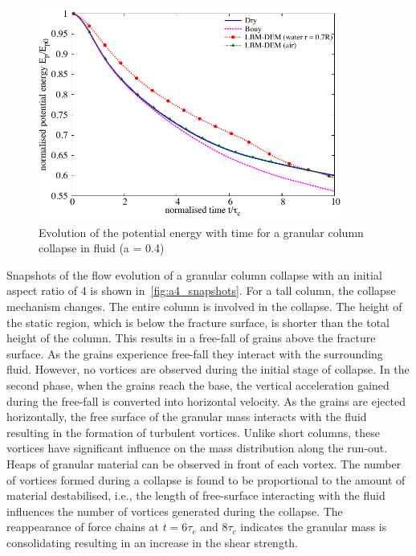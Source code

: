 \begin{figure}
	\centering
    \includegraphics[width=0.9\textwidth]{PE_a04f}
    \caption{Evolution of the potential energy with time for a granular column 
    collapse in fluid (a = 0.4)}
    \label{fig:PE_a04f}
\end{figure}


Snapshots of the flow evolution of a granular column collapse with an initial 
aspect ratio of 4 is shown in~\cref{fig:a4_snapshots}. For a tall column, the 
collapse mechanism changes. The entire column is involved in the collapse. The 
height of the static region, which is below the fracture surface, is shorter 
than the total height of the column. This results in a free-fall of grains 
above the fracture surface. As the grains experience free-fall they interact 
with the surrounding fluid. However, no vortices are observed during the 
initial stage of collapse. In the second phase, when the grains reach the base, 
the vertical acceleration gained during the free-fall is converted into
horizontal velocity. As the grains are ejected horizontally, the free 
surface of the granular mass interacts with the fluid resulting in the 
formation of turbulent vortices. Unlike short columns, these vortices have 
significant 
influence on the mass distribution along the run-out. Heaps of granular 
material can be observed in front of each vortex. The number of vortices 
formed during a collapse is found to be proportional to the amount of material 
destabilised, i.e., the length of free-surface interacting with the fluid 
influences the number of vortices generated during the collapse. The 
reappearance of force chains at $t = 6\tau_c$ and $8\tau_c$ indicates the 
granular mass is consolidating resulting in an increase in the shear strength. 

